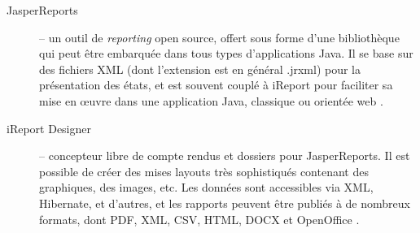 \begin{description}
\item[JasperReports] -- un outil de \textit{reporting} open source, offert sous forme d'une bibliothèque qui peut être embarquée dans tous types d'applications Java. Il se base sur des fichiers XML (dont l'extension est en général .jrxml) pour la présentation des états, et est souvent couplé à iReport pour faciliter sa mise en œuvre dans une application Java, classique ou orientée web \cite{jasper-reports}.
\item[iReport Designer] -- concepteur libre de compte rendus et dossiers pour JasperReports. Il est possible de créer des mises layouts très sophistiqués contenant des graphiques, des images, etc. Les données sont accessibles via XML, Hibernate, et d'autres, et les rapports peuvent être publiés à de nombreux formats, dont PDF, XML, CSV, HTML, DOCX et OpenOffice \cite{ireport}.
\end{description}